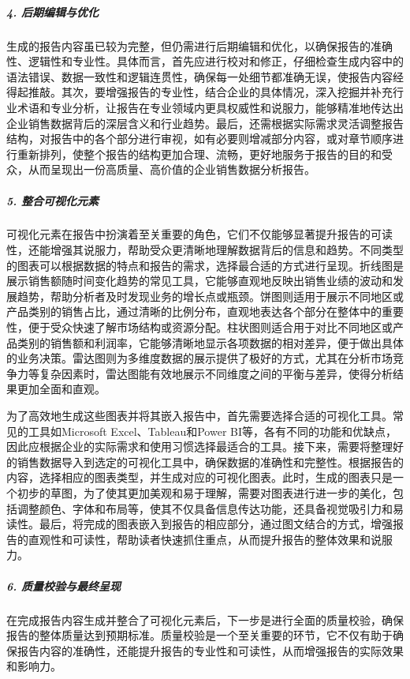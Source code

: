 \subparagraph{4. 后期编辑与优化}

生成的报告内容虽已较为完整，但仍需进行后期编辑和优化，以确保报告的准确性、逻辑性和专业性。具体而言，首先应进行校对和修正，仔细检查生成内容中的语法错误、数据一致性和逻辑连贯性，确保每一处细节都准确无误，使报告内容经得起推敲。其次，要增强报告的专业性，结合企业的具体情况，深入挖掘并补充行业术语和专业分析，让报告在专业领域内更具权威性和说服力，能够精准地传达出企业销售数据背后的深层含义和行业趋势。最后，还需根据实际需求灵活调整报告结构，对报告中的各个部分进行审视，如有必要则增减部分内容，或对章节顺序进行重新排列，使整个报告的结构更加合理、流畅，更好地服务于报告的目的和受众，从而呈现出一份高质量、高价值的企业销售数据分析报告。

\subparagraph{5. 整合可视化元素}

可视化元素在报告中扮演着至关重要的角色，它们不仅能够显著提升报告的可读性，还能增强其说服力，帮助受众更清晰地理解数据背后的信息和趋势。不同类型的图表可以根据数据的特点和报告的需求，选择最合适的方式进行呈现。折线图是展示销售额随时间变化趋势的常见工具，它能够直观地反映出销售业绩的波动和发展趋势，帮助分析者及时发现业务的增长点或瓶颈。饼图则适用于展示不同地区或产品类别的销售占比，通过清晰的比例分布，直观地表达各个部分在整体中的重要性，便于受众快速了解市场结构或资源分配。柱状图则适合用于对比不同地区或产品类别的销售额和利润率，它能够清晰地显示各项数据的相对差异，便于做出具体的业务决策。雷达图则为多维度数据的展示提供了极好的方式，尤其在分析市场竞争力等复杂因素时，雷达图能有效地展示不同维度之间的平衡与差异，使得分析结果更加全面和直观。

为了高效地生成这些图表并将其嵌入报告中，首先需要选择合适的可视化工具。常见的工具如Microsoft Excel、Tableau和Power BI等，各有不同的功能和优缺点，因此应根据企业的实际需求和使用习惯选择最适合的工具。接下来，需要将整理好的销售数据导入到选定的可视化工具中，确保数据的准确性和完整性。根据报告的内容，选择相应的图表类型，并生成对应的可视化图表。此时，生成的图表只是一个初步的草图，为了使其更加美观和易于理解，需要对图表进行进一步的美化，包括调整颜色、字体和布局等，使其不仅具备信息传达功能，还具备视觉吸引力和易读性。最后，将完成的图表嵌入到报告的相应部分，通过图文结合的方式，增强报告的直观性和可读性，帮助读者快速抓住重点，从而提升报告的整体效果和说服力。

\subparagraph{6. 质量校验与最终呈现}

在完成报告内容生成并整合了可视化元素后，下一步是进行全面的质量校验，确保报告的整体质量达到预期标准。质量校验是一个至关重要的环节，它不仅有助于确保报告内容的准确性，还能提升报告的专业性和可读性，从而增强报告的实际效果和影响力。

